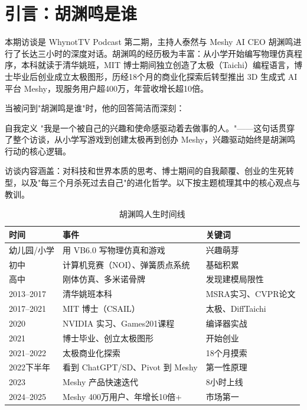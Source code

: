 \section{引言：胡渊鸣是谁}

本期访谈是 WhynotTV Podcast 第二期，主持人泰然与 Meshy AI CEO 胡渊鸣进行了长达三小时的深度对话。胡渊鸣的经历极为丰富：从小学开始编写物理仿真程序，本科就读于清华姚班，MIT 博士期间独立创造了太极（Taichi）编程语言，博士毕业后创业成立太极图形，历经18个月的商业化探索后转型推出 3D 生成式 AI 平台 Meshy，现服务用户超400万，年营收增长超10倍。

当被问到"胡渊鸣是谁"时，他的回答简洁而深刻：

\begin{importantbox}{自我定义}
"我是一个被自己的兴趣和使命感驱动着去做事的人。"——这句话贯穿了整个访谈，从小学写游戏到创建太极再到创办 Meshy，兴趣驱动始终是胡渊鸣行动的核心逻辑。
\end{importantbox}

访谈内容涵盖：对科技和世界本质的思考、博士期间的自我颠覆、创业的生死转型，以及"每三个月杀死过去自己"的进化哲学。以下按主题梳理其中的核心观点与教训。

\begin{table}[H]
\centering
\caption{胡渊鸣人生时间线}
\begin{tabular}{lll}
\toprule
\textbf{时间} & \textbf{事件} & \textbf{关键词} \\
\midrule
幼儿园/小学 & 用 VB6.0 写物理仿真和游戏 & 兴趣萌芽 \\
初中 & 计算机竞赛（NOI）、弹簧质点系统 & 基础积累 \\
高中 & 刚体仿真、多米诺骨牌 & 发现建模局限性 \\
2013--2017 & 清华姚班本科 & MSRA实习、CVPR论文 \\
2017--2021 & MIT 博士（CSAIL） & 太极、DiffTaichi \\
2020 & NVIDIA 实习、Games201课程 & 编译器实战 \\
2021 & 博士毕业、创立太极图形 & 开始创业 \\
2021--2022 & 太极商业化探索 & 18个月摸索 \\
2022下半年 & 看到 ChatGPT/SD、Pivot 到 Meshy & 第一性原理 \\
2023 & Meshy 产品快速迭代 & 8小时上线 \\
2024--2025 & Meshy 400万用户、年增长10倍+ & 市场第一 \\
\bottomrule
\end{tabular}
\end{table}

